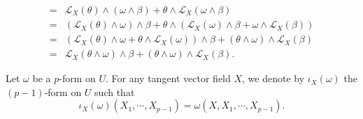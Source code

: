 \begin{proofenv}
$$\begin{aligned}
        = & \mathcal{L}_{X}(\theta)\wedge(\omega \wedge \beta) + \theta \wedge \mathcal{L}_{X}(\omega \wedge \beta)\\
        = & (\mathcal{L}_{X}(\theta)\wedge\omega) \wedge \beta + \theta \wedge (\mathcal{L}_{X}(\omega) \wedge \beta + \omega \wedge \mathcal{L}_{X}(\beta))\\
        = & (\mathcal{L}_{X}(\theta) \wedge \omega + \theta \wedge \mathcal{L}_{X}(\omega)) \wedge \beta + (\theta \wedge \omega)\wedge\mathcal{L}_X(\beta)\\
        = & \mathcal{L}_{X}(\theta \wedge \omega) \wedge \beta + (\theta \wedge \omega) \wedge \mathcal{L}_{X}(\beta).
    \end{aligned}$$
\end{proofenv}

\begin{definitionenv}
    Let $\omega$ be a $p$-form on $U$.
    For any tangent vector field $X$,
    we denote by $\iota_{X}(\omega)$ the $(p-1)$-form on $U$ such that
    $$\iota_{X}(\omega)(X_1,\cdots,X_{p-1}) = \omega(X,X_1,\cdots,X_{p-1}).$$
\end{definitionenv}

